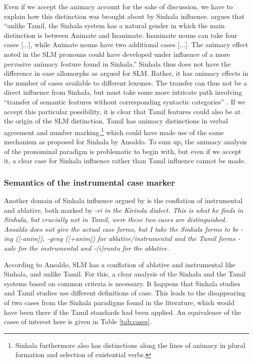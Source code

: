 \documentclass[a4paper,10pt]{article}
\begin{document}
Even if we accept the animacy account for the sake of discussion, we have to explain how this distinction was brought about by Sinhala influence. \citet[31]{Ansaldo2008genesis} argues that ``unlike Tamil, the Sinhala system has a natural gender in which the main distinction is between Animate and Inanimate. Inanimate nouns can take four cases [...], while Animate nouns have two additional cases [...]. The animacy effect noted in the SLM pronouns could have developed under influence of a more pervasive animacy feature found in Sinhala.''
Sinhala thus does not have the difference in case allomorphs as argued for SLM. Rather, it has animacy effects in the number of cases available to different lexemes. The transfer can thus not be a direct influence from Sinhala, but must take some more intricate path involving ``transfer of semantic features without corresponding syntactic categories'' \citep[31]{Ansaldo2008genesis}. If we accept this particular possibility, it is clear that Tamil features could also be at the origin of the SLM distinction. Tamil has animacy distinctions in verbal agreement and number marking,\footnote{Sinhala 
 furthermore also has distinctions along the lines of animacy in plural formation \citep{NitzEtAlfc} and selection of existential verbs.
} which could have made use of the same mechanism as proposed for Sinhala by Ansaldo. To sum up, the animacy analysis of the pronominal paradigm is problematic to begin with, but even if we accept it, a clear case for Sinhala influence rather than Tamil influence cannot be made.

 
\subsubsection{Semantics of the instrumental case marker}
Another domain of Sinhala influence argued by \citet[32,35]{Ansaldo2008genesis} is the conflation of instrumental and ablative, both marked by \em -ri\ng{} \em in the Kirinda dialect. This is what he finds in Sinhala, but crucially not in Tamil, were these two  cases are distinguished. Ansaldo does not give the actual case forms, but I take the Sinhala forms to be \em -ing \em ([-anim]), \em -geng \em ([+anim]) for ablative/instrumental and the Tamil forms \em -aale \em for the instrumental and \em -(i)runtu \em for the ablative.

According to Ansaldo, SLM has a conflation of ablative and instrumental like Sinhala, and unlike Tamil. For this, a clear analysis of the Sinhala and the Tamil systems based on common criteria is necessary. It happens that Sinhala studies and Tamil studies use different definitions of case. This leads to the disappearing of two cases from the Sinhala paradigms found in the literature, which would have been there if the Tamil standards had been applied. An equivalence of the cases of interest here is given in Table \ref{tab:cases}.
\end{document}
